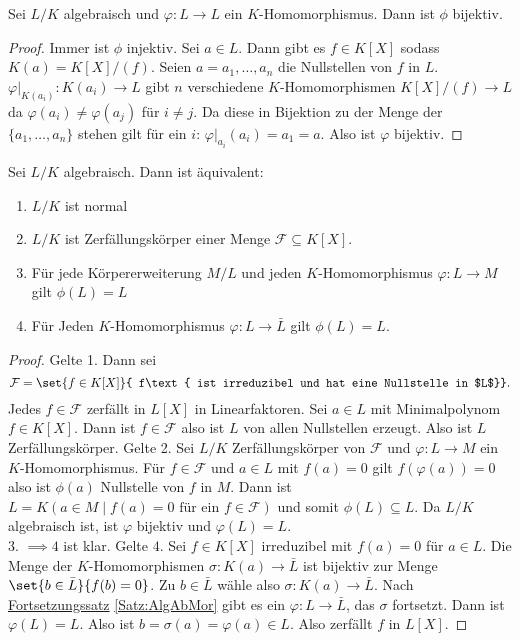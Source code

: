 \begin{Lemma}
    Sei $L/K$ algebraisch und $\varphi\colon L\to L$ ein $K$-Homomorphismus. Dann ist $\phi$ bijektiv.
\end{Lemma}
\begin{proof}
    Immer ist $\phi$ injektiv.
    Sei $a\in L$. Dann gibt es $f\in K[X]$ sodass $K(a)=K[X]/(f)$. Seien $a=a_1,\dots,a_n$ die Nullstellen von $f$ in $L$.
    $\varphi|_{K(a_i)}\colon K(a_i)\to L$ gibt $n$ verschiedene $K$-Homomorphismen $K[X]/(f)\to L$ da $\varphi(a_i)\neq \varphi(a_j)$ für $i\neq j$. Da diese in Bijektion zu der Menge der $\{a_1,\dots,a_n\}$ stehen gilt für ein $i$: $\varphi|_{a_i}(a_i)=a_1=a$. Also ist $\varphi$ bijektiv.
\end{proof}
\begin{Satz}
    Sei $L/K$ algebraisch. Dann ist äquivalent:
    \begin{enumerate}
        \item $L/K$ ist normal
        \item $L/K$ ist Zerfällungskörper einer Menge $\mathcal F\subseteq K[X]$.
        \item Für jede Körpererweiterung $M/L$ und jeden $K$-Homomorphismus $\varphi\colon L\to M$ gilt $\phi(L)=L$
        \item Für Jeden $K$-Homomorphismus $\varphi\colon L\to\bar L$ gilt $\phi(L)=L$.
    \end{enumerate}
\end{Satz}
\begin{proof}
    Gelte 1. Dann sei $$\mathcal F=\set{f\in K[X]}{ f\text{ ist irreduzibel und hat eine Nullstelle in $L$}}.$$
    Jedes $f\in \mathcal F$ zerfällt in $L[X]$ in Linearfaktoren.
    Sei $a\in L$ mit Minimalpolynom $f\in K[X]$. Dann ist $f\in\mathcal F$ also ist $L$ von allen Nullstellen erzeugt. Also ist $L$ Zerfällungskörper.
    Gelte 2. Sei $L/K$ Zerfällungskörper von $\mathcal F$ und $\varphi\colon L\to M$ ein $K$-Homomorphismus. Für $f\in \mathcal F$ und $a\in L$ mit $f(a)=0$ gilt $f(\varphi(a))=0$ also ist $\phi(a)$ Nullstelle von $f$ in $M$.
    Dann ist $L=K(a\in M\mid f(a)=0 \text{ für ein } f\in\mathcal F)$ und somit $\phi(L)\subseteq L$. Da $L/K$ algebraisch ist, ist $\varphi$ bijektiv und $\varphi(L)=L.$\\
    3. $\implies 4$ ist klar. Gelte $4.$ Sei $f\in K[X]$ irreduzibel mit $f(a)=0$ für $a\in L$.
    Die Menge der $K$-Homomorphismen $\sigma\colon K(a)\to \bar L$ ist bijektiv zur Menge $\set{b\in\bar L}{ f(b)=0}$. Zu $b\in \bar L$ wähle also $\sigma\colon K(a)\to \bar L$.
    Nach \hyperref[Satz:AlgAbMor]{Fortsetzungssatz} \ref{Satz:AlgAbMor} gibt es ein $\varphi\colon L\to \bar L$, das $\sigma$ fortsetzt. Dann ist $\varphi(L)=L$. Also ist $b=\sigma(a)=\varphi(a)\in L$. Also zerfällt $f$ in $L[X]$.
\end{proof}
